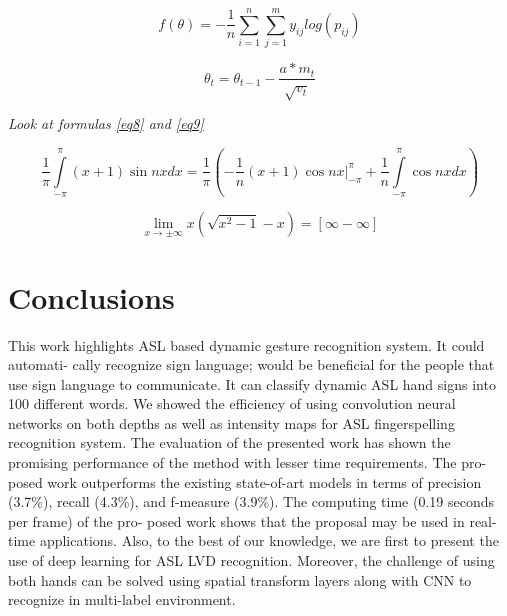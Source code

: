 \documentclass[
  manuscript=article,  %
  layout=preprint,  %
  year=20xx,
  volume=x,
]{joas}
\begin{document}
\begin{equation}
f(\theta)=-\frac{1}{n}\sum^n_{i=1}\sum^m_{j=1}y_{ij}log\left(p_{ij}\right)\label{eq6}
\end{equation}

\begin{equation}
    \theta_{t}=\theta_{t-1}-\frac{a*m_{t}}{\sqrt{v_{t}}}\label{eq7}
\end{equation}


\par {\Huge \emph{Look at formulas \ref{eq8} and \ref{eq9}}}

\begin{equation}
    \frac{1}{\pi}\int\limits_{-\pi}^{\pi}(x+1)\sin{nx}dx = \frac{1}{\pi}\left(-\frac{1}{n}(x+1)\cos{nx}\Big|_{-\pi}^{\pi}+\frac{1}{n}\int\limits_{-\pi}^{\pi}\cos{nx}dx\right) \label{eq8}
\end{equation}

\begin{equation}
    \lim_{x \to \pm\infty} x\left(\sqrt{x^2-1}-x\right) = [\infty - \infty] \label{eq9}
\end{equation}

\section{Conclusions}
This work highlights ASL based dynamic gesture recognition system. It could automati- cally recognize sign language; would be beneficial for the people that use sign language to communicate. It can classify dynamic ASL hand signs into 100 different words. We showed the efficiency of using convolution neural networks on both depths as well as intensity maps for ASL fingerspelling recognition system. The evaluation of the presented work has shown the promising performance of the method with lesser time requirements. The pro- posed work outperforms the existing state-of-art models in terms of precision (3.7\%), recall (4.3\%), and f-measure (3.9\%). The computing time (0.19 seconds per frame) of the pro- posed work shows that the proposal may be used in real-time applications. Also, to the best of our knowledge, we are first to present the use of deep learning for ASL LVD recognition. Moreover, the challenge of using both hands can be solved using spatial transform layers along with CNN to recognize in multi-label environment.



\end{document}
